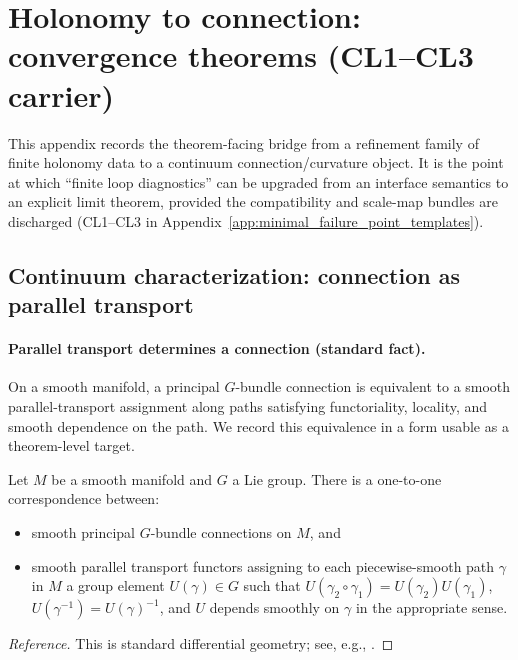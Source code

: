 \section{Holonomy to connection: convergence theorems (CL1--CL3 carrier)}
\label{app:holonomy_to_connection_convergence_theorems}

This appendix records the theorem-facing bridge from a refinement family of finite holonomy data to a continuum connection/curvature object.
It is the point at which ``finite loop diagnostics'' can be upgraded from an interface semantics to an explicit limit theorem, provided the compatibility and scale-map bundles are discharged (CL1--CL3 in Appendix~\ref{app:minimal_failure_point_templates}).

\subsection{Continuum characterization: connection as parallel transport}
\paragraph{Parallel transport determines a connection (standard fact).}
\MathTag On a smooth manifold, a principal $G$-bundle connection is equivalent to a smooth parallel-transport assignment along paths satisfying functoriality, locality, and smooth dependence on the path.
We record this equivalence in a form usable as a theorem-level target.

\begin{theorem}
\label{thm:connection_parallel_transport_equivalence}
\MathTag Let $M$ be a smooth manifold and $G$ a Lie group.
There is a one-to-one correspondence between:
\begin{itemize}
\item smooth principal $G$-bundle connections on $M$, and
\item smooth parallel transport functors assigning to each piecewise-smooth path $\gamma$ in $M$ a group element $U(\gamma)\in G$ such that $U(\gamma_2\circ\gamma_1)=U(\gamma_2)U(\gamma_1)$, $U(\gamma^{-1})=U(\gamma)^{-1}$, and $U$ depends smoothly on $\gamma$ in the appropriate sense.
\end{itemize}
\end{theorem}

\begin{proof}[Reference]
This is standard differential geometry; see, e.g., \cite{KobayashiNomizu1963,MilnorStasheff1974}.
\end{proof}

